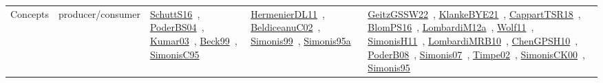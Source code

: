 {\begin{longtable}{lp{3cm}>{\raggedright\arraybackslash}p{6cm}>{\raggedright\arraybackslash}p{6cm}>{\raggedright\arraybackslash}p{8cm}}
Concepts & producer/consumer & \href{../works/SchuttS16.pdf}{SchuttS16}~\cite{SchuttS16}, \href{../works/PoderBS04.pdf}{PoderBS04}~\cite{PoderBS04}, \href{../works/Kumar03.pdf}{Kumar03}~\cite{Kumar03}, \href{../works/Beck99.pdf}{Beck99}~\cite{Beck99}, \href{../works/SimonisC95.pdf}{SimonisC95}~\cite{SimonisC95} & \href{../works/HermenierDL11.pdf}{HermenierDL11}~\cite{HermenierDL11}, \href{../works/BeldiceanuC02.pdf}{BeldiceanuC02}~\cite{BeldiceanuC02}, \href{../works/Simonis99.pdf}{Simonis99}~\cite{Simonis99}, \href{../works/Simonis95a.pdf}{Simonis95a}~\cite{Simonis95a} & \href{../works/GeitzGSSW22.pdf}{GeitzGSSW22}~\cite{GeitzGSSW22}, \href{../works/KlankeBYE21.pdf}{KlankeBYE21}~\cite{KlankeBYE21}, \href{../works/CappartTSR18.pdf}{CappartTSR18}~\cite{CappartTSR18}, \href{../works/BlomPS16.pdf}{BlomPS16}~\cite{BlomPS16}, \href{../works/LombardiM12a.pdf}{LombardiM12a}~\cite{LombardiM12a}, \href{../works/Wolf11.pdf}{Wolf11}~\cite{Wolf11}, \href{../works/SimonisH11.pdf}{SimonisH11}~\cite{SimonisH11}, \href{../works/LombardiMRB10.pdf}{LombardiMRB10}~\cite{LombardiMRB10}, \href{../works/ChenGPSH10.pdf}{ChenGPSH10}~\cite{ChenGPSH10}, \href{../works/PoderB08.pdf}{PoderB08}~\cite{PoderB08}, \href{../works/Simonis07.pdf}{Simonis07}~\cite{Simonis07}, \href{../works/Timpe02.pdf}{Timpe02}~\cite{Timpe02}, \href{../works/SimonisCK00.pdf}{SimonisCK00}~\cite{SimonisCK00}, \href{../works/Simonis95.pdf}{Simonis95}~\cite{Simonis95}\\

\end{longtable}}
